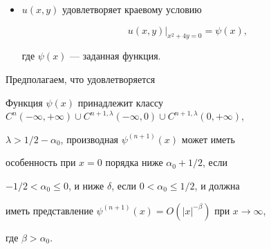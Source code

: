 {\begin{itemize}
\begin{gather}
A_\alpha(x,y,\tau)=\sum^{[m/2]}_{s=1} 


\frac{\tau^{(2s)}(x)(-1)^s}{(\alpha)_s s!}y^s,\quad 


\alpha\ne -n,\notag\\ 


A_\alpha(x,y,\tau)=\sum^n_{s=1} 


\frac{\tau^{(2s)}(x)(-1)^s}{(\alpha)_s s!}y^s- 


\frac{\tau^{(2n+2)}(x)}{n!(n+1)!}y^{n+1}\bigg[\ln|y| 


-\sum^{n+1}_{s=1}\frac{1}{s}\bigg],\quad \alpha=-n,\notag 


\end{gather} 


$[\,\cdot\,]$ --- целая часть числа, $(\alpha)_0=1$, 


$(\alpha)_s=\alpha(\alpha+1)(\alpha+2)\dotsb(\alpha+s-1);$ 


\item[5)] $u(x,y)$ удовлетворяет краевому условию 


$$ 


u(x,y)|_{x^2+4y=0}=\psi(x), 


$$ 


где $\psi(x)$ --- заданная функция. 


\end{itemize}


} 


\medskip 


 


Предполагаем, что удовлетворяется 


 


 


\begin{cond} 


Функция $\psi(x)$ принадлежит классу $C^n(-\infty,+\infty)\cup 


C^{n+1,\lambda}(-\infty,0)\cup C^{n+1,\lambda}(0,+\infty)$, 


$\lambda>1/2-\alpha_0$, производная $\psi^{(n+1)}(x)$ может иметь 


особенность при $x=0$ порядка ниже $\alpha_0+1/2$, если 


$-1/2<\alpha_0\le0$, и ниже $\delta$, если $0<\alpha_0\le1/2$, и должна 


иметь представление $\psi^{(n+1)}(x)=O(|x|^{-\beta})$ при $x\to\infty$, 


где $\beta>\alpha_0$. 


\end{cond} 


